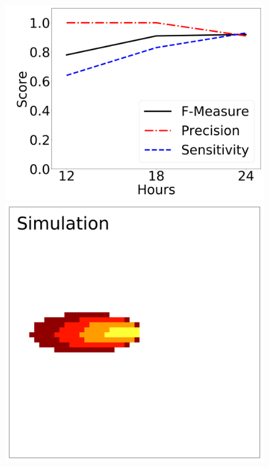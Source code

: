 \documentclass[smallcondensed]{svjour3}     %
\begin{document}
\begin{figure}[htbp]
	\includegraphics[height=0.16\textheight]{timeAnalysis_fmeasure0.png}
	\\
	\includegraphics[height=0.16\textheight]{timeAnalysis_simulation1.png}
	~

\end{figure}
\end{document}
